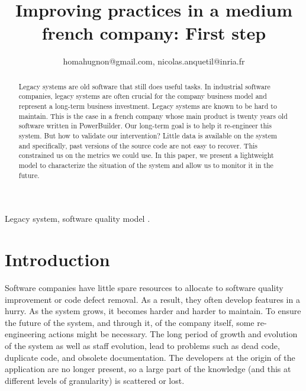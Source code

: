 \documentclass[10pt,conference]{IEEEtran}
\begin{document}
\title{Improving practices in a medium french  company: First step}

\author{
homahugnon@gmail.com, nicolas.anquetil@inria.fr}


\maketitle

\begin{abstract}
Legacy systems are old software that still does useful tasks.
In industrial software companies, legacy systems are often crucial for the company business model and represent a long-term business investment.
Legacy systems are known to be hard to maintain.
This is the case in a french company whose main product is twenty years old software written in PowerBuilder.
Our long-term goal is to help it re-engineer this system.
But how to validate our intervention?
Little data is available on the system and specifically, past versions of the source code are not easy to recover.
This constrained us on the metrics we could use.
In this paper, we present a lightweight model to characterize the situation of the system and allow us to monitor it in the future.
\end{abstract}

\begin{IEEEkeywords}
Legacy system, software quality model .
\end{IEEEkeywords}

\section{Introduction}

Software companies have little spare resources to allocate to software quality improvement or code defect removal.
As a result, they often develop features in a hurry.
As the system grows, it becomes harder and harder to maintain.
To ensure the future of the system, and through it, of the company itself, some re-engineering actions might be necessary.
The long period of growth and evolution of the system as well as staff evolution, lead to problems such as dead code, duplicate code, and obsolete documentation. 
The developers at the origin of the application are no longer present, so a large part of the knowledge (and this at different levels of granularity) is scattered or lost. 
\end{document}
